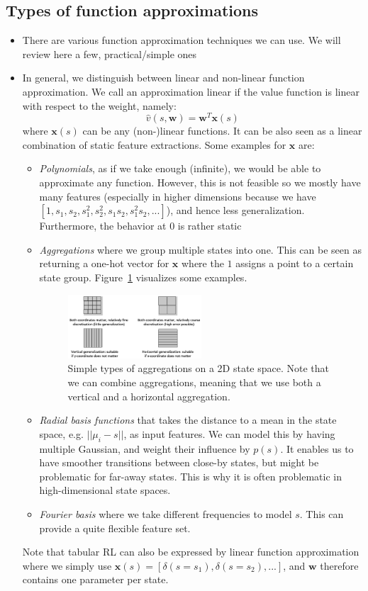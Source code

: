 \subsection{Types of function approximations}
\begin{itemize}
	\item There are various function approximation techniques we can use. We will review here a few, practical/simple ones
	\item In general, we distinguish between linear and non-linear function approximation. We call an approximation linear if the value function is linear with respect to the weight, namely:
	$$\hat{v}(s,\bm{w})=\bm{w}^T\bm{x}(s)$$
	where $\bm{x}(s)$ can be any (non-)linear functions. It can be also seen as a linear combination of static feature extractions. Some examples for $\bm{x}$ are:
	\begin{itemize}
		\item \textit{Polynomials}, as if we take enough (infinite), we would be able to approximate any function. However, this is not feasible so we mostly have many features (especially in higher dimensions because we have $\left[1,s_1,s_2,s_1^2, s_2^2, s_1s_2, s_1^2s_2,...\right]$), and hence less generalization. Furthermore, the behavior at 0 is rather static
		\item \textit{Aggregations} where we group multiple states into one. This can be seen as returning a one-hot vector for $\bm{x}$ where the $1$ assigns a point to a certain state group. Figure~\ref{fig:rl_approximate_value_based_aggregation} visualizes some examples.
		\begin{figure}[ht!]
			\centering
			\includegraphics[width=0.5\textwidth]{figures/rl_approximate_value_based_aggregation.png}
			\caption{Simple types of aggregations on a 2D state space. Note that we can combine aggregations, meaning that we use both a vertical and a horizontal aggregation.}
			\label{fig:rl_approximate_value_based_aggregation}
		\end{figure}
		\item \textit{Radial basis functions} that takes the distance to a mean in the state space, e.g. $||\mu_i-s||$, as input features. We can model this by having multiple Gaussian, and weight their influence by $p(s)$. It enables us to have smoother transitions between close-by states, but might be problematic for far-away states. This is why it is often problematic in high-dimensional state spaces.
		\item \textit{Fourier basis} where we take different frequencies to model $s$. This can provide a quite flexible feature set.
	\end{itemize}
	Note that tabular RL can also be expressed by linear function approximation where we simply use $\bm{x}(s)=\left[\delta(s=s_1), \delta(s=s_2),...\right]$, and $\bm{w}$ therefore contains one parameter per state.
	

\end{itemize}
